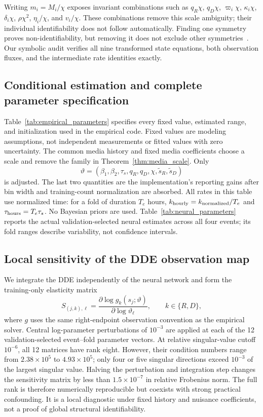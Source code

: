 Writing $m_i=M_i/\chi$ exposes invariant combinations such as $q_R\chi$, $q_D\chi$, $\varpi_i\chi$, $\kappa_i\chi$, $\delta_i\chi$, $\rho\chi^2$, $\eta_i/\chi$, and $v_i/\chi$. These combinations remove this scale ambiguity; their individual identifiability does not follow automatically. Finding one symmetry proves non-identifiability, but removing it does not exclude other symmetries~\cite{villaverde2021scaling}. Our symbolic audit verifies all nine transformed state equations, both observation fluxes, and the intermediate rate identities exactly.

\subsection{Conditional estimation and complete parameter specification}
Table~\ref{tab:empirical_parameters} specifies every fixed value, estimated range, and initialization used in the empirical code. Fixed values are modeling assumptions, not independent measurements or fitted values with zero uncertainty. The common media history and fixed media coefficients choose a scale and remove the family in Theorem~\ref{thm:media_scale}. Only
\[
\vartheta=(\beta_1,\beta_2,\tau_s,q_R,q_D,\chi,
\widetilde s_R,\widetilde s_D)
\]
is adjusted. The last two quantities are the implementation's reporting gains after bin width and training-count normalization are absorbed. All rates in this table use normalized time: for a fold of duration $T_e$ hours, $k_{\rm hourly}=k_{\rm normalized}/T_e$ and $\tau_{\rm hours}=T_e\tau_s$. No Bayesian priors are used. Table~\ref{tab:neural_parameters} reports the actual validation-selected neural estimates across all four events; its fold ranges describe variability, not confidence intervals.



\subsection{Local sensitivity of the DDE observation map}
We integrate the DDE independently of the neural network and form the training-only elasticity matrix
\begin{equation}
S_{(j,k),\ell}=\frac{\partial\log g_k(s_j;\vartheta)}
 {\partial\log\vartheta_\ell},\qquad k\in\{R,D\},
\label{eq:ident_sensitivity}
\end{equation}
where $g$ uses the same right-endpoint observation convention as the empirical solver. Central log-parameter perturbations of $10^{-3}$ are applied at each of the 12 validation-selected event--fold parameter vectors. At relative singular-value cutoff $10^{-6}$, all 12 matrices have rank eight. However, their condition numbers range from $2.38\times10^5$ to $4.93\times10^5$; only four or five singular directions exceed $10^{-3}$ of the largest singular value. Halving the perturbation and integration step changes the sensitivity matrix by less than $1.5\times10^{-7}$ in relative Frobenius norm. The full rank is therefore numerically reproducible but coexists with strong practical confounding. It is a local diagnostic under fixed history and nuisance coefficients, not a proof of global structural identifiability.

